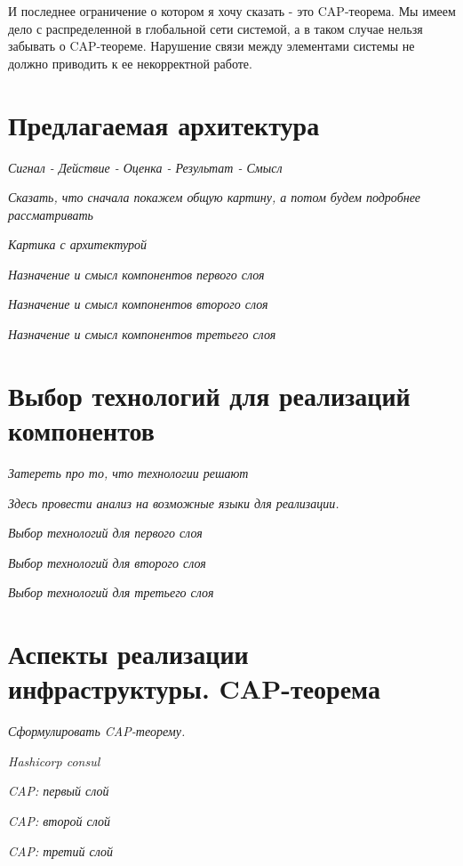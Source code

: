 И последнее ограничение о котором я хочу сказать - это CAP-теорема. Мы имеем дело с распределенной в глобальной сети системой, а в таком случае нельзя забывать о CAP-теореме. Нарушение связи между элементами системы не должно приводить к ее некорректной работе.

\section{Предлагаемая архитектура}

\textit{Сигнал - Действие - Оценка - Результат - Смысл}

\textit{Сказать, что сначала покажем общую картину, а потом будем подробнее рассматривать}

\textit{Картика с архитектурой}

\textit{Назначение и смысл компонентов первого слоя}

\textit{Назначение и смысл компонентов второго слоя}

\textit{Назначение и смысл компонентов третьего слоя}


\section{Выбор технологий для реализаций компонентов}

\textit{Затереть про то, что технологии решают}

\textit{Здесь провести анализ на возможные языки для реализации.}

\textit{Выбор технологий для первого слоя}

\textit{Выбор технологий для второго слоя}

\textit{Выбор технологий для третьего слоя}


\section{Аспекты реализации инфраструктуры. CAP-теорема}

\textit{Сформулировать CAP-теорему.}

\textit{Hashicorp consul}

\textit{CAP: первый слой}

\textit{CAP: второй слой}

\textit{CAP: третий слой}